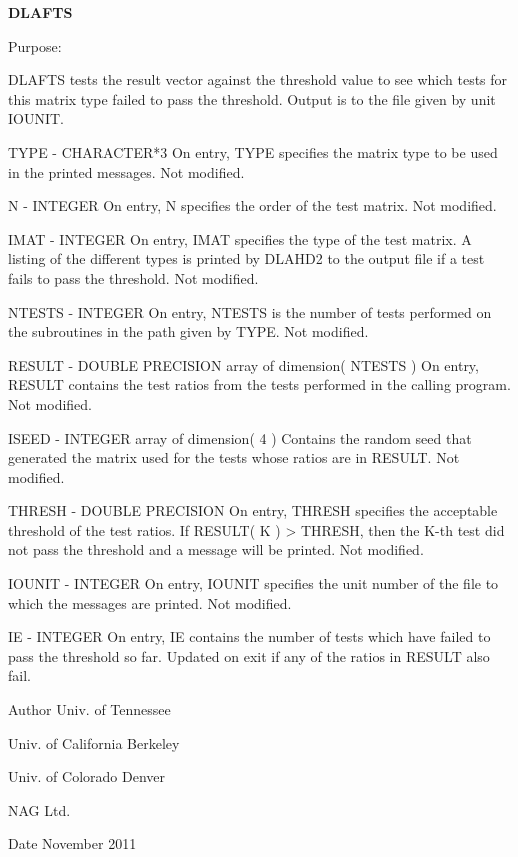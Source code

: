 {\bfseries D\+L\+A\+F\+T\+S} 

\begin{DoxyParagraph}{Purpose\+: }
\begin{DoxyVerb}    DLAFTS tests the result vector against the threshold value to
    see which tests for this matrix type failed to pass the threshold.
    Output is to the file given by unit IOUNIT.\end{DoxyVerb}
 \begin{DoxyVerb}  TYPE   - CHARACTER*3
           On entry, TYPE specifies the matrix type to be used in the
           printed messages.
           Not modified.

  N      - INTEGER
           On entry, N specifies the order of the test matrix.
           Not modified.

  IMAT   - INTEGER
           On entry, IMAT specifies the type of the test matrix.
           A listing of the different types is printed by DLAHD2
           to the output file if a test fails to pass the threshold.
           Not modified.

  NTESTS - INTEGER
           On entry, NTESTS is the number of tests performed on the
           subroutines in the path given by TYPE.
           Not modified.

  RESULT - DOUBLE PRECISION               array of dimension( NTESTS )
           On entry, RESULT contains the test ratios from the tests
           performed in the calling program.
           Not modified.

  ISEED  - INTEGER            array of dimension( 4 )
           Contains the random seed that generated the matrix used
           for the tests whose ratios are in RESULT.
           Not modified.

  THRESH - DOUBLE PRECISION
           On entry, THRESH specifies the acceptable threshold of the
           test ratios.  If RESULT( K ) > THRESH, then the K-th test
           did not pass the threshold and a message will be printed.
           Not modified.

  IOUNIT - INTEGER
           On entry, IOUNIT specifies the unit number of the file
           to which the messages are printed.
           Not modified.

  IE     - INTEGER
           On entry, IE contains the number of tests which have
           failed to pass the threshold so far.
           Updated on exit if any of the ratios in RESULT also fail.\end{DoxyVerb}
 
\end{DoxyParagraph}
\begin{DoxyAuthor}{Author}
Univ. of Tennessee 

Univ. of California Berkeley 

Univ. of Colorado Denver 

N\+A\+G Ltd. 
\end{DoxyAuthor}
\begin{DoxyDate}{Date}
November 2011 
\end{DoxyDate}
\hypertarget{group__double__eig_gaf5ca6e066facb65a20568f3b790f1624}{}
